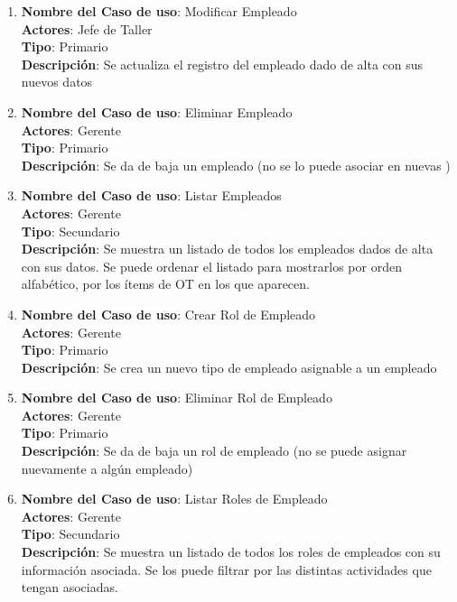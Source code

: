 \documentclass[12pt]{extarticle}
\begin{document}
\begin{spacing}{1.2}
\begin{enumerate}
        \item 	\textbf{Nombre del Caso de uso}: Modificar Empleado\\
                \textbf{Actores}: Jefe de Taller\\
                \textbf{Tipo}: Primario\\
                \textbf{Descripción}: Se actualiza el registro del empleado dado de alta con sus nuevos datos
        
        \item 	\textbf{Nombre del Caso de uso}: Eliminar Empleado\\
                \textbf{Actores}: Gerente\\
                \textbf{Tipo}: Primario\\
                \textbf{Descripción}: Se da de baja un empleado (no se lo puede asociar en nuevas \OTs{})
        
        \item 	\textbf{Nombre del Caso de uso}: Listar Empleados\\
                \textbf{Actores}: Gerente\\
                \textbf{Tipo}: Secundario\\
                \textbf{Descripción}: Se muestra un listado de todos los empleados dados de alta con sus datos. Se puede ordenar el listado para mostrarlos por orden alfabético, por los ítems de OT en los que aparecen.
        
        \item 	\textbf{Nombre del Caso de uso}: Crear Rol de Empleado\\
                \textbf{Actores}: Gerente\\
                \textbf{Tipo}: Primario\\
                \textbf{Descripción}: Se crea un nuevo tipo de empleado asignable a un empleado
        
        \item 	\textbf{Nombre del Caso de uso}: Eliminar Rol de Empleado\\
                \textbf{Actores}: Gerente\\
                \textbf{Tipo}: Primario\\
                \textbf{Descripción}: Se da de baja un rol de empleado (no se puede asignar nuevamente a algún empleado)
        
        \item 	\textbf{Nombre del Caso de uso}: Listar Roles de Empleado\\
                \textbf{Actores}: Gerente\\
                \textbf{Tipo}: Secundario\\
                \textbf{Descripción}: Se muestra un listado de todos los roles de empleados con su información asociada. Se los puede filtrar por las distintas actividades que tengan asociadas.
        



\end{enumerate}
\end{spacing}
\end{document}
